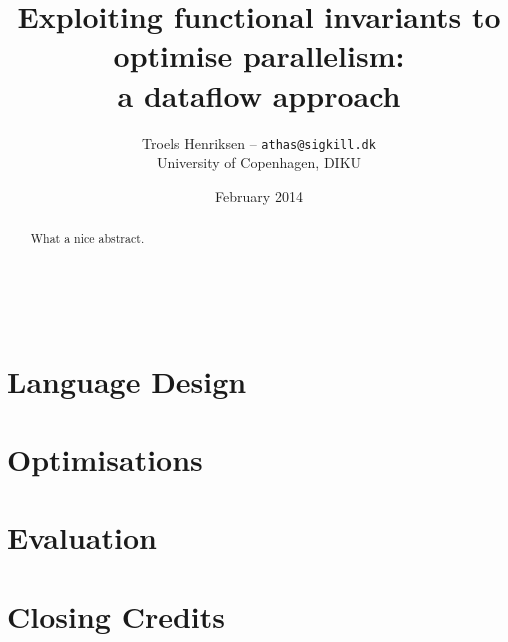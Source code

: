 \documentclass[10pt,a4paper,final,oneside,openany]{memoir}
\title{Exploiting functional invariants to optimise parallelism:\\a dataflow approach}
\author{
  Troels Henriksen -- \texttt{athas@sigkill.dk} \\
University of Copenhagen, DIKU}
\date{February 2014}
\begin{document}
\frontmatter

% 

 \clearpage

\maketitle
~
\vspace{3cm}
  \begin{abstract}
    What a nice abstract.
  \end{abstract}

\clearpage
\tableofcontents*

\mainmatter
{}


\part{Language Design}
\label{part:languagedesign}







\part{Optimisations}









\part{Evaluation}





\clearpage

\part{Closing Credits}

{}
\printbibliography

\backmatter
\appendix

\end{document}
